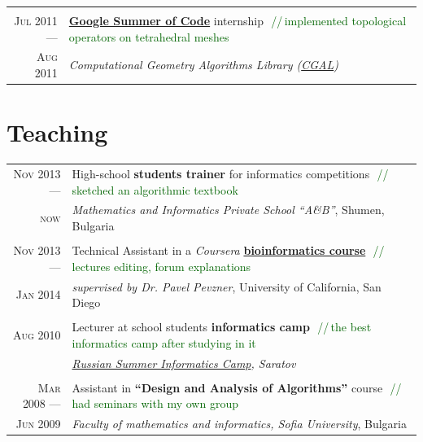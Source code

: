 \documentclass[a4paper,10pt]{article}
\def\myline{\color{linegray}\vline}
\newcommand{\minorcolor}[1]{\textcolor{mygray}{#1}}
\newcommand{\comment}[1]{\small\textcolor{darkgreen}{\,\,//\,#1}}
\newcommand{\mydate}[1]{\minorcolor{\textsc{#1}}}
\begin{document}
{\begin{tabular}{r!{\myline}p{14cm}}
        \\
        \mydate{Jul 2011 ---}       &   \textbf{\href{http://code.google.com/soc/}{Google Summer of Code}} internship
                                        \comment{implemented topological operators on tetrahedral meshes}\\
        \mydate{Aug 2011}           &   \textit{Computational Geometry Algorithms Library (\href{http://www.cgal.org/}{CGAL})}\\
\end{tabular}


\section{Teaching}
\hspace{0mm}\begin{tabular}{r!{\myline}p{14cm}}
        \mydate{Nov 2013 ---}       &   High-school \textbf{students trainer} for informatics competitions
                                        \comment{sketched an algorithmic textbook}\\
        \mydate{now}                &   \textit{Mathematics and Informatics Private School ``A\&B''}, Shumen, Bulgaria\\ %

        \\
        \mydate{Nov 2013 ---}       &   Technical Assistant in a \textit{Coursera} \textbf{\href{https://www.coursera.org/course/bioinformatics}{bioinformatics course}}
                                        \comment{lectures editing, forum explanations}\\
        \mydate{Jan 2014}           &   \textit{supervised by Dr. Pavel Pevzner}, University of California, San Diego\\
	
        \\
        \mydate{Aug 2010}           &   Lecturer at school students \textbf{informatics camp}
                                        \comment{the best informatics camp after studying in it}\\
                                    &   \textit{\href{http://lksh.ru/}{Russian Summer Informatics Camp}, Saratov}\\
	
	\\
	\mydate{Mar 2008 ---}       &   Assistant in \textbf{``Design and Analysis of Algorithms''} course
                                        \comment{had seminars with my own group}\\
	\mydate{Jun 2009}           &   \textit{Faculty of mathematics and informatics, Sofia University}, Bulgaria\\
\end{tabular}


}
\end{document}
